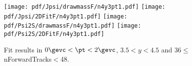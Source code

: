 \begin{figure}[H]
\begin{center}
\texttt{[image: pdf/Jpsi/drawmassF/n4y3pt1.pdf]}
\texttt{[image: pdf/Jpsi/2DFitF/n4y3pt1.pdf]}
\vspace*{-0.5cm}
\texttt{[image: pdf/Psi2S/drawmassF/n4y3pt1.pdf]}
\texttt{[image: pdf/Psi2S/2DFitF/n4y3pt1.pdf]}
\vspace*{-0.5cm}
\end{center}
\caption{Fit results in $0\gevc<\pt<2\gevc$, $3.5<y<4.5$ and 36$\leq$nForwardTracks$<$48.}
\label{Fitn4y3pt1}
\end{figure}
